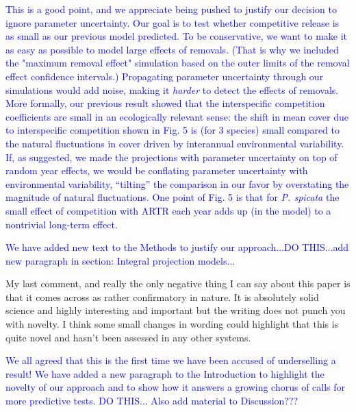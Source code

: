 \documentclass[12pt]{article}
\newcommand{\response}{\textcolor{blue}}
\begin{document}
\response{ This is a good point, and we appreciate being pushed to justify our decision to ignore parameter uncertainty. Our goal is to test
whether competitive release is as small as our previous model predicted. To be conservative, we want to make it as easy as possible to
model large effects of removals. (That is why we included the "maximum removal effect" simulation based on the outer limits of the removal effect
confidence intervals.) Propagating parameter uncertainty through our simulations would add noise, making it \emph{harder} to 
detect the effects of removals. More formally, our previous result showed that the interspecific competition coefficients are small in an ecologically
relevant sense: the shift in mean cover due to interspecific competition shown in Fig. 5 is (for 3 species) small compared to the natural fluctuations in cover driven by interannual environmental variability. 
If, as suggested, we made the projections with parameter uncertainty on top of random year effects, we would be conflating parameter uncertainty with environmental variability, ``tilting'' the
comparison in our favor by overstating the magnitude of natural fluctuations. One point of Fig. 5 is that for \emph{P. spicata} the small effect of competition with ARTR each year adds up (in the model) to a nontrivial long-term effect.

We have added new text to the Methods to justify our approach...DO THIS...add new paragraph in section: Integral projection models...
  }

 
My last comment, and really the only negative thing I can say about this paper is that it comes across as rather confirmatory in nature. It is absolutely solid science and 
highly interesting and important but the writing does not punch you with novelty. I think some small changes in wording could highlight that this is quite novel and hasn't 
been assessed in any other systems. 

\response{We all agreed that this is the first time we have been accused of underselling a result! We have added a new paragraph to the Introduction
to highlight the novelty of our approach and to show how it answers a growing chorus of calls for more predictive tests. DO THIS...
Also add material to Discussion???}
\end{document}
